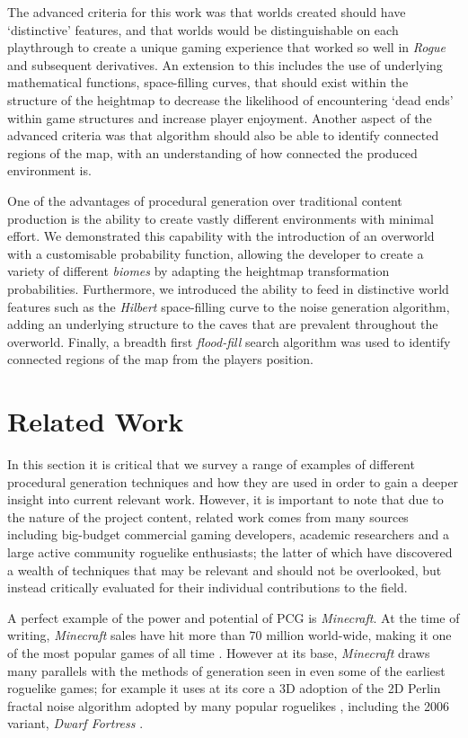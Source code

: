 \documentclass[12pt,a4paper]{article}
\begin{document}
The advanced criteria for this work was that worlds created should have `distinctive' features, and that worlds would be distinguishable on each playthrough to create a unique gaming experience that worked so well in \emph{Rogue} and subsequent derivatives. An extension to this includes the use of underlying mathematical functions, space-filling curves, that should exist within the structure of the heightmap to decrease the likelihood of encountering `dead ends' within game structures and increase player enjoyment.  Another aspect of the advanced criteria was that algorithm should also be able to identify connected regions of the map, with an understanding of how connected the produced environment is.

One of the advantages of procedural generation over traditional content production is the ability to create vastly different environments with minimal effort. We demonstrated this capability with the introduction of an overworld with a customisable probability function, allowing the developer to create a variety of different \emph{biomes} by adapting the heightmap transformation probabilities. Furthermore, we introduced the ability to feed in distinctive world features such as the \emph{Hilbert} space-filling curve to the noise generation algorithm, adding an underlying structure to the caves that are prevalent throughout the overworld. Finally, a breadth first \emph{flood-fill} search algorithm was used to identify connected regions of the map from the players position. 


\section{Related Work}

In this section it is critical that we survey a range of examples of different procedural generation techniques and how they are used in order to gain a deeper insight into current relevant work. However, it is important to note that due to the nature of the project content, related work comes from many sources including big-budget commercial gaming developers, academic researchers and a large active community roguelike enthusiasts; the latter of which have discovered a wealth of techniques that may be relevant and should not be overlooked, but instead critically evaluated for their individual contributions to the field.

A perfect example of the power and potential of PCG is \emph{Minecraft}. At the time of writing, \emph{Minecraft} sales have hit more than 70 million world-wide, making it one of the most popular games of all time \cite{ukie}. However at its base, \emph{Minecraft} draws many parallels with the methods of generation seen in even some of the earliest roguelike games; for example it uses at its core a 3D adoption of the 2D Perlin fractal noise algorithm adopted by many popular roguelikes \cite{notch}, including the 2006 variant, \emph{Dwarf Fortress} \cite{Dunhack}. 
\end{document}
